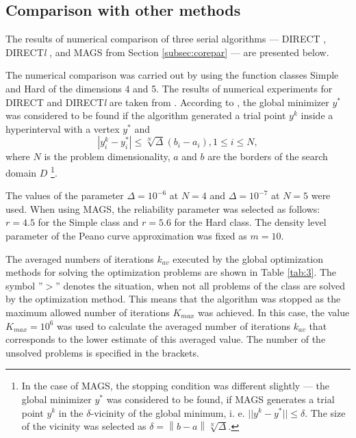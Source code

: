 \documentclass{aims}
\theoremstyle{definition}
\begin{document}
\subsection{Comparison with other methods}
The results of numerical comparison of three serial algorithms --- DIRECT
\cite{Jones}, DIRECT\textit{l} \cite{Gablonsky}, and MAGS from Section \ref{subsec:corepar} --- are presented below.

The numerical comparison was carried out by using the function classes Simple and Hard
of the dimensions 4 and 5. The results of numerical experiments for DIRECT and
DIRECT\textit{l} are taken from \cite{sergeyevKvasov2006}. According to \cite{sergeyevKvasov2006}, the global minimizer \(y^*\)
was considered to be found if the algorithm generated a trial point \(y^k\) inside
a hyperinterval with a vertex \(y^*\) and
\begin{displaymath}
    |y^k_i-y^*_i|\le \sqrt[N]{\Delta}(b_i-a_i), 1 \le i\le N,
\end{displaymath}
where \(N\) is the problem dimensionality, $a$ and $b$ are the borders of the search domain \(D\)
\footnote{In the case of MAGS, the stopping condition was different slightly --- the
global minimizer \(y^*\) was considered to be found, if MAGS generates a trial
point \(y^k\)  in the \(\delta\)-vicinity of the global minimum, i. e. \(||y^k-y^*||\le\delta\).
The size of the vicinity was selected  as \(\delta=\left\|b-a\right\|\sqrt[N]{\Delta}\).}.

The values of the parameter \(\Delta = 10^{-6}\) at \(N = 4\) and \(\Delta = 10^{-7}\)
at \(N = 5\) were used. When using MAGS, the reliability parameter was selected as
follows: \(r = 4.5\) for the Simple class and \(r = 5.6\) for the Hard class.
The density level parameter of the Peano curve approximation was fixed as \(m = 10\).

The averaged numbers of iterations $k_{av}$ executed by the global optimization methods
for solving the optimization problems are shown in Table \ref{tab:3}. The symbol ''$>$''
denotes the situation, when not all problems of the class are solved by the optimization
method. This means that the algorithm was stopped as the maximum allowed number of
iterations $K_{max}$ was achieved. In this case, the value $K_{max}= 10^6$  was used to
calculate the averaged number of iterations $k_{av}$ that corresponds to the lower estimate
of this averaged value. The number of the unsolved problems is specified in the brackets.
\end{document}
